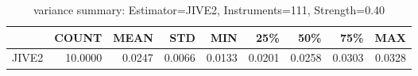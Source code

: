 \begin{table}[ht]
\centering
\caption{variance summary: Estimator=JIVE2, Instruments=111, Strength=0.40}
\begin{tabular}{lrrrrrrrr}
\toprule
 & COUNT & MEAN & STD & MIN & 25\% & 50\% & 75\% & MAX \\
\midrule
JIVE2 & 10.0000 & 0.0247 & 0.0066 & 0.0133 & 0.0201 & 0.0258 & 0.0303 & 0.0328 \\
\bottomrule
\end{tabular}
\end{table}
